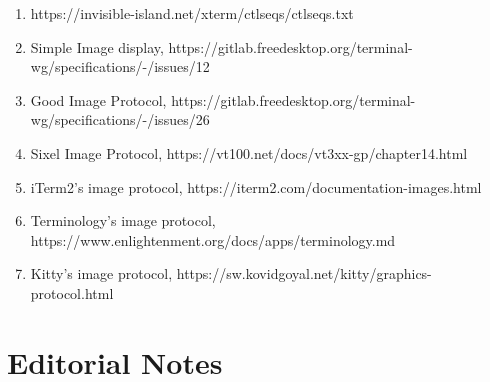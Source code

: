 \documentclass{article}
\begin{document}
\begin{enumerate}
    \item \label{ref:ctlseqs}https://invisible-island.net/xterm/ctlseqs/ctlseqs.txt
    \item \label{ref:twg-simple-image-display}Simple Image display, https://gitlab.freedesktop.org/terminal-wg/specifications/-/issues/12
    \item \label{ref:twg-gip}Good Image Protocol, https://gitlab.freedesktop.org/terminal-wg/specifications/-/issues/26
    \item \label{ref:image-sixel}Sixel Image Protocol, https://vt100.net/docs/vt3xx-gp/chapter14.html
    \item \label{ref:image-item2}iTerm2's image protocol, https://iterm2.com/documentation-images.html
    \item \label{ref:image-terminology}Terminology's image protocol, https://www.enlightenment.org/docs/apps/terminology.md 
    \item \label{ref:image-kitty}Kitty's image protocol, https://sw.kovidgoyal.net/kitty/graphics-protocol.html
\end{enumerate}

\section{Editorial Notes}
\listoftodos
\end{document}

